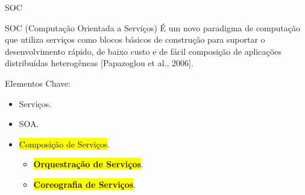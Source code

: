\documentclass[xcolor=svgnames]{beamer}
\begin{document}
    \begin{frame}{SOC}
       	\begin{block}{SOC (Computação Orientada a Serviços)}\vspace{-.3\baselineskip}
           É um novo paradigma de computação que utiliza serviços como blocos básicos de construção
           para suportar o desenvolvimento rápido, de baixo custo e de fácil composição de aplicações
           distribuídas heterogêneas [Papazoglou et al., 2006]. %
        \end{block}
        Elementos Chave:

        \begin{itemize}
           \item <1->Serviços.
           \item <1->SOA.
           \item <2->\colorbox{yellow}{Composição de Serviços}.
                \begin{itemize}
                  \item <3->\colorbox{yellow}{\textbf{Orquestração de Serviços}}.
                  \item <4->\colorbox{yellow}{\textbf{Coreografia de Serviços}}.
                \end{itemize}
        \end{itemize}

    \end{frame}


\end{document}
